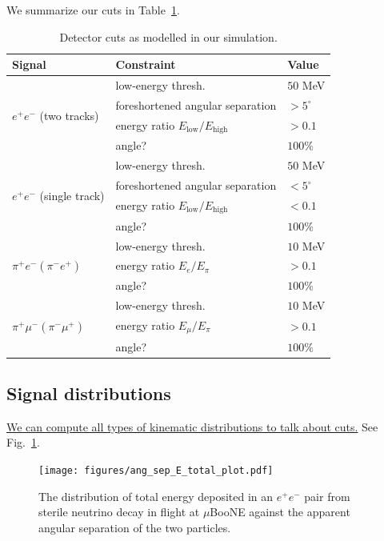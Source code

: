 \documentclass[11pt, a4paper]{article}
\newcommand{\reffig}[1]{Fig.~\ref{#1}}
\newcommand{\reftab}[1]{Table~\ref{#1}}
\newcommand{\newtext}[2]{\textcolor{#1}{\ul{#2}}}
\begin{document}
We summarize our cuts in \reftab{tab:cuts}.
%
\begin{table}[t]
\centering
\begin{tabular}{ l | l | l}
Signal & Constraint & Value \\
\hline\hline
 \multirow{4}{*}{$e^+ e^-$ (two tracks)} & low-energy thresh. & $50$ MeV\\
 \cline{2-3}
 & foreshortened angular separation & $>5^\circ$ \\
 \cline{2-3}
 & energy ratio $E_\text{low}/E_\text{high}$ & $>0.1$\\
 \cline{2-3}
 & angle? & $100\%$\\
\cline{1-3}
 \multirow{4}{*}{$e^+ e^-$ (single track)} & low-energy thresh. & $50$ MeV\\
 \cline{2-3}
 & foreshortened angular separation & $<5^\circ$ \\
 \cline{2-3}
 & energy ratio $E_\text{low}/E_\text{high}$ & $<0.1$\\
 \cline{2-3}
 & angle? & $100\%$\\
\cline{1-3}
 \multirow{3}{*}{$\pi^+e^-(\pi^-e^+)$} & low-energy thresh. & $10$ MeV\\
 \cline{2-3}
 & energy ratio $E_e/E_\pi$ & $>0.1$\\
 \cline{2-3}
 & angle? & $100\%$\\
\cline{1-3}
 \multirow{3}{*}{$\pi^+\mu^-(\pi^-\mu^+)$} & low-energy thresh. & $10$ MeV\\
\cline{2-3}
 & energy ratio $E_\mu/E_\pi$ & $>0.1$\\
\cline{2-3}
 & angle? & $100\%$\\
\end{tabular}
\caption{\label{tab:cuts}Detector cuts as modelled in our simulation.}
\end{table}
\newpage
\newpage

\subsection{Signal distributions}

\newtext{PB}{We can compute all types of kinematic distributions to talk about
cuts.} See \reffig{fig:ang_sep_E_total}.

\begin{figure}[t]
\center
\texttt{[image: figures/ang\_sep\_E\_total\_plot.pdf]}

\caption{\label{fig:ang_sep_E_total}The distribution of total energy deposited in an $e^+e^-$ pair from sterile neutrino decay in flight at $\mu$BooNE against the apparent angular separation of the two particles.}

\end{figure}
\end{document}
